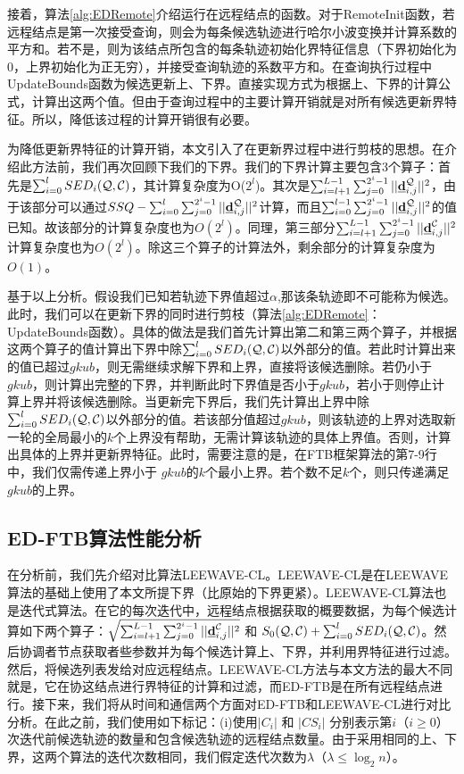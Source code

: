 接着，算法\ref{alg:EDRemote}介绍运行在远程结点的函数。对于\textsf{RemoteInit}函数，若远程结点是第一次接受查询，则会为每条候选轨迹进行哈尔小波变换并计算系数的平方和。若不是，则为该结点所包含的每条轨迹初始化界特征信息（下界初始化为0，上界初始化为正无穷），并接受查询轨迹的系数平方和。在查询执行过程中\textsf{UpdateBounds}函数为候选更新上、下界。直接实现方式为根据上、下界的计算公式，计算出这两个值。但由于查询过程中的主要计算开销就是对所有候选更新界特征。所以，降低该过程的计算开销很有必要。

为降低更新界特征的计算开销，本文引入了在更新界过程中进行剪枝的思想。在介绍此方法前，我们再次回顾下我们的下界。我们的下界计算主要包含3个算子：首先是$\sum_{i=0}^{l}SED_{i}({\cal Q},{\cal C})$，其计算复杂度为O($2^{l}$)。其次是$\sum_{i=l+1}^{L-1}\sum_{j=0}^{2^i-1}||\emph{{\textbf{d}}}_{i,j}^{\cal Q}||^2$，由于该部分可以通过$SSQ-\sum_{i=0}^{l}\sum_{j=0}^{2^i-1}||\emph{{\textbf{d}}}_{i,j}^{\cal Q}||^2$计算，而且$\sum_{i=0}^{l-1}\sum_{j=0}^{2^i-1}||\emph{{\textbf{d}}}_{i,j}^{\cal Q}||^2$的值已知。故该部分的计算复杂度也为$O(2^{l})$。同理，第三部分$\sum_{i=l+1}^{L-1}\sum_{j=0}^{2^i-1}||\emph{{\textbf{d}}}_{i,j}^{\cal C}||^2$计算复杂度也为$O(2^{l})$。除这三个算子的计算法外，剩余部分的计算复杂度为$O(1)$。

基于以上分析。假设我们已知若轨迹下界值超过$\alpha$,那该条轨迹即不可能称为候选。此时，我们可以在更新下界的同时进行剪枝（算法\ref{alg:EDRemote}：\textsf{UpdateBounds}函数）。具体的做法是我们首先计算出第二和第三两个算子，并根据这两个算子的值计算出下界中除$\sum_{i=0}^{l}SED_{i}({\cal Q},{\cal C})$以外部分的值。若此时计算出来的值已超过$gkub$，则无需继续求解下界和上界，直接将该候选删除。若仍小于$gkub$，则计算出完整的下界，并判断此时下界值是否小于$gkub$，若小于则停止计算上界并将该候选删除。当更新完下界后，我们先计算出上界中除$\sum_{i=0}^{l}SED_{i}({\cal Q},{\cal C})$以外部分的值。若该部分值超过$gkub$，则该轨迹的上界对选取新一轮的全局最小的$k$个上界没有帮助，无需计算该轨迹的具体上界值。否则，计算出具体的上界并更新界特征。此时，需要注意的是，在FTB框架算法的第7-9行中，我们仅需传递上界小于 $gkub$的$k$个最小上界。若个数不足$k$个，则只传递满足$gkub$的上界。
 
 \subsection{ED-FTB算法性能分析}
 在分析前，我们先介绍对比算法LEEWAVE-CL。LEEWAVE-CL是在LEEWAVE算法的基础上使用了本文所提下界（比原始的下界更紧）。LEEWAVE-CL算法也是迭代式算法。在它的每次迭代中，远程结点根据获取的概要数据，为每个候选计算如下两个算子：$\sqrt{\sum_{i=l+1}^{L-1}\sum_{j=0}^{2^i-1}||\emph{{\textbf{d}}}_{i,j}^{\cal C}||^2}$ 和  $S_{0}({\cal Q},{\cal C})+\sum_{i=0}^{l}SED_{i}({\cal Q},{\cal C})$。然后协调者节点获取者些参数并为每个候选计算上、下界，并利用界特征进行过滤。然后，将候选列表发给对应远程结点。LEEWAVE-CL方法与本文方法的最大不同就是，它在协这结点进行界特征的计算和过滤，而ED-FTB是在所有远程结点进行。接下来，我们将从时间和通信两个方面对ED-FTB和LEEWAVE-CL进行对比分析。在此之前，我们使用如下标记：(i)使用$|C_{i}|$ 和 $|CS_{i}|$ 分别表示第$i$（$i\ge 0$）次迭代前候选轨迹的数量和包含候选轨迹的远程结点数量。由于采用相同的上、下界，这两个算法的迭代次数相同，我们假定迭代次数为$\lambda$（$\lambda \le \log_{2}n$）。
 
